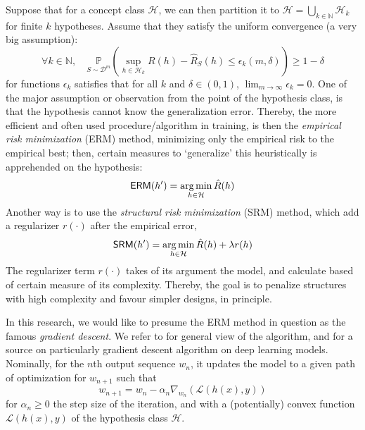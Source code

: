 \documentclass[10pt,oneside,oldfontcommands,dvipsnames,article]{memoir}
\begin{document}
Suppose that for a concept class $\mathcal{H}$, we can then partition it to $\mathcal{H}=\bigcup_{k\in \mathbb{N}} \mathcal{H}_{k}$ for finite $k$ hypotheses. Assume that they satisfy the uniform convergence (a very big assumption): 
\begin{equation}
    \forall k \in \mathbb{N}, \quad \underset{S\sim \mathcal{D}^{m}}{\mathbb{P}} \left(\sup_{h\in \mathcal{H}_{k}} R(h) - \hat{R}_{S}(h)\leq \epsilon_{k}(m,\delta)\right) \geq 1- \delta
\end{equation}
for functions $\epsilon_{k}$ satisfies that for all $k$ and $\delta\in (0,1)$, $\lim_{m\to\infty}\epsilon_{k}=0$. One of the major assumption or observation from the point of the hypothesis class, is that the hypothesis cannot know the generalization error. Thereby, the more efficient and often used procedure/algorithm in training, is then the \textit{empirical risk minimization} (ERM) method, minimizing only the empirical risk to the empirical best; then, certain measures to `generalize' this heuristically is apprehended on the hypothesis:
\begin{equation}
        \mathsf{ERM}(h') = \operatorname*{arg\,min}_{h\in \mathcal{H}} \hat{R}(h)
    \end{equation}
Another way is to use the \textit{structural risk minimization} (SRM) method, which add a regularizer $r(\cdot)$ after the empirical error,
\begin{equation}
        \mathsf{SRM}(h') = \operatorname*{arg\,min}_{h\in \mathcal{H}} \hat{R}(h) + \lambda r(h)
    \end{equation}
The regularizer term $r(\cdot)$ takes of its argument the model, and calculate based of certain measure of its complexity. Thereby, the goal is to penalize structures with high complexity and favour simpler designs, in principle.

In this research, we would like to presume the ERM method in question as the famous \textit{gradient descent}. We refer to \cite{achlioptas_stochastic_nodate,ruder_overview_2017} for general view of the algorithm, and \cite{zhang_gradient_2019} for a source on particularly gradient descent algorithm on deep learning models. Nominally, for the $n$th output sequence $w_{n}$, it updates the model to a given path of optimization for $w_{n+1}$ such that 
\begin{equation}
    w_{n+1} = w_{n} - \alpha_{n}\nabla_{w_{n}}(\mathcal{L}(h(x),y))
\end{equation}
for $\alpha_{n}\geq 0$ the step size of the iteration, and with a (potentially) convex function $\mathcal{L}(h(x),y)$ of the hypothesis class $\mathcal{H}$. 
\end{document}
